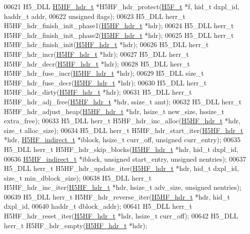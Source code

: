 \begin{DoxyCode}
00621 H5\_DLL \hyperlink{struct_h5_h_f__hdr__t}{H5HF\_hdr\_t} *H5HF\_hdr\_protect(\hyperlink{struct_h5_f__t}{H5F\_t} *f, hid\_t dxpl\_id, haddr\_t addr,
00622     \textcolor{keywordtype}{unsigned} flags);
00623 H5\_DLL herr\_t H5HF\_hdr\_finish\_init\_phase1(\hyperlink{struct_h5_h_f__hdr__t}{H5HF\_hdr\_t} *hdr);
00624 H5\_DLL herr\_t H5HF\_hdr\_finish\_init\_phase2(\hyperlink{struct_h5_h_f__hdr__t}{H5HF\_hdr\_t} *hdr);
00625 H5\_DLL herr\_t H5HF\_hdr\_finish\_init(\hyperlink{struct_h5_h_f__hdr__t}{H5HF\_hdr\_t} *hdr);
00626 H5\_DLL herr\_t H5HF\_hdr\_incr(\hyperlink{struct_h5_h_f__hdr__t}{H5HF\_hdr\_t} *hdr);
00627 H5\_DLL herr\_t H5HF\_hdr\_decr(\hyperlink{struct_h5_h_f__hdr__t}{H5HF\_hdr\_t} *hdr);
00628 H5\_DLL herr\_t H5HF\_hdr\_fuse\_incr(\hyperlink{struct_h5_h_f__hdr__t}{H5HF\_hdr\_t} *hdr);
00629 H5\_DLL \textcolor{keywordtype}{size\_t} H5HF\_hdr\_fuse\_decr(\hyperlink{struct_h5_h_f__hdr__t}{H5HF\_hdr\_t} *hdr);
00630 H5\_DLL herr\_t H5HF\_hdr\_dirty(\hyperlink{struct_h5_h_f__hdr__t}{H5HF\_hdr\_t} *hdr);
00631 H5\_DLL herr\_t H5HF\_hdr\_adj\_free(\hyperlink{struct_h5_h_f__hdr__t}{H5HF\_hdr\_t} *hdr, ssize\_t amt);
00632 H5\_DLL herr\_t H5HF\_hdr\_adjust\_heap(\hyperlink{struct_h5_h_f__hdr__t}{H5HF\_hdr\_t} *hdr, hsize\_t new\_size, hssize\_t extra\_free);
00633 H5\_DLL herr\_t H5HF\_hdr\_inc\_alloc(\hyperlink{struct_h5_h_f__hdr__t}{H5HF\_hdr\_t} *hdr, \textcolor{keywordtype}{size\_t} alloc\_size);
00634 H5\_DLL herr\_t H5HF\_hdr\_start\_iter(\hyperlink{struct_h5_h_f__hdr__t}{H5HF\_hdr\_t} *hdr, \hyperlink{struct_h5_h_f__indirect__t}{H5HF\_indirect\_t} *iblock, 
      hsize\_t curr\_off, \textcolor{keywordtype}{unsigned} curr\_entry);
00635 H5\_DLL herr\_t H5HF\_hdr\_skip\_blocks(\hyperlink{struct_h5_h_f__hdr__t}{H5HF\_hdr\_t} *hdr, hid\_t dxpl\_id,
00636     \hyperlink{struct_h5_h_f__indirect__t}{H5HF\_indirect\_t} *iblock, \textcolor{keywordtype}{unsigned} start\_entry, \textcolor{keywordtype}{unsigned} nentries);
00637 H5\_DLL herr\_t H5HF\_hdr\_update\_iter(\hyperlink{struct_h5_h_f__hdr__t}{H5HF\_hdr\_t} *hdr, hid\_t dxpl\_id, \textcolor{keywordtype}{size\_t} min\_dblock\_size);
00638 H5\_DLL herr\_t H5HF\_hdr\_inc\_iter(\hyperlink{struct_h5_h_f__hdr__t}{H5HF\_hdr\_t} *hdr, hsize\_t adv\_size, \textcolor{keywordtype}{unsigned} nentries);
00639 H5\_DLL herr\_t H5HF\_hdr\_reverse\_iter(\hyperlink{struct_h5_h_f__hdr__t}{H5HF\_hdr\_t} *hdr, hid\_t dxpl\_id,
00640     haddr\_t dblock\_addr);
00641 H5\_DLL herr\_t H5HF\_hdr\_reset\_iter(\hyperlink{struct_h5_h_f__hdr__t}{H5HF\_hdr\_t} *hdr, hsize\_t curr\_off);
00642 H5\_DLL herr\_t H5HF\_hdr\_empty(\hyperlink{struct_h5_h_f__hdr__t}{H5HF\_hdr\_t} *hdr);

\end{DoxyCode}
